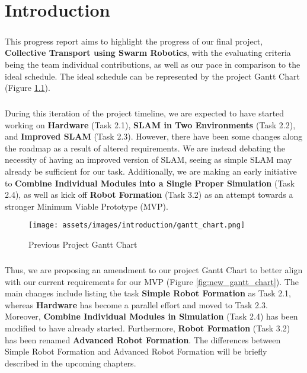 \chapter{Introduction}

\paragraph*{}
This progress report aims to highlight the progress of our final project, \textbf{Collective Transport using Swarm Robotics}, with the evaluating criteria being the team individual contributions, as well as our pace in comparison to the ideal schedule. The ideal schedule can be represented by the project Gantt Chart (Figure \ref{fig:gantt_chart}).

\paragraph*{}
During this iteration of the project timeline, we are expected to have started working on \textbf{Hardware} (Task 2.1), \textbf{SLAM in Two Environments} (Task 2.2), and \textbf{Improved SLAM} (Task 2.3). However, there have been some changes along the roadmap as a result of altered requirements. We are instead debating the necessity of having an improved version of SLAM, seeing as simple SLAM may already be sufficient for our task. Additionally, we are making an early initiative to \textbf{Combine Individual Modules into a Single Proper Simulation} (Task 2.4), as well as kick off \textbf{Robot Formation} (Task 3.2) as an attempt towards a stronger Minimum Viable Prototype (MVP).

\begin{figure}[H]
    \centering
    \texttt{[image: assets/images/introduction/gantt\_chart.png]}
    \caption{Previous Project Gantt Chart}
    \label{fig:gantt_chart}
\end{figure}

\paragraph*{}
Thus, we are proposing an amendment to our project Gantt Chart to better align with our current requirements for our MVP (Figure \ref{fig:new_gantt_chart}). The main changes include listing the task \textbf{Simple Robot Formation} as Task 2.1, whereas \textbf{Hardware} has become a parallel effort and moved to Task 2.3. Moreover, \textbf{Combine Individual Modules in Simulation} (Task 2.4) has been modified to have already started. Furthermore, \textbf{Robot Formation} (Task 3.2) has been renamed \textbf{Advanced Robot Formation}. The differences between Simple Robot Formation and Advanced Robot Formation will be briefly described in the upcoming chapters.

